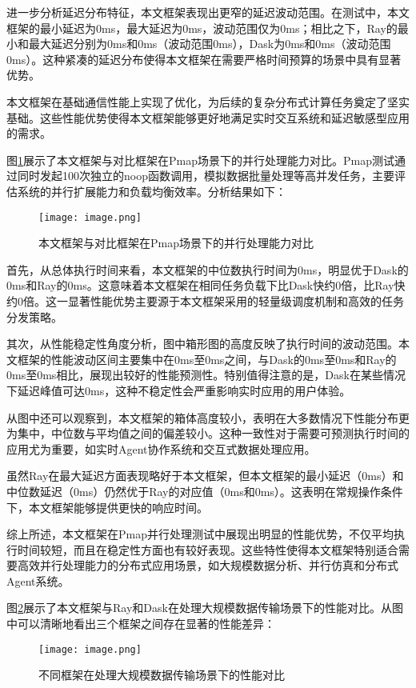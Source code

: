 进一步分析延迟分布特征，本文框架表现出更窄的延迟波动范围。在测试中，本文框架的最小延迟为0ms，最大延迟为0ms，波动范围仅为0ms；相比之下，Ray的最小和最大延迟分别为0ms和0ms（波动范围0ms），Dask为0ms和0ms（波动范围0ms）。这种紧凑的延迟分布使得本文框架在需要严格时间预算的场景中具有显著优势。

本文框架在基础通信性能上实现了优化，为后续的复杂分布式计算任务奠定了坚实基础。这些性能优势使得本文框架能够更好地满足实时交互系统和延迟敏感型应用的需求。

图\ref{fig:exp_pmap}展示了本文框架与对比框架在Pmap场景下的并行处理能力对比。Pmap测试通过同时发起100次独立的noop函数调用，模拟数据批量处理等高并发任务，主要评估系统的并行扩展能力和负载均衡效率。分析结果如下：

\begin{figure}[ht]
    \centering
    \texttt{[image: image.png]}
    \caption{本文框架与对比框架在Pmap场景下的并行处理能力对比}
    \label{fig:exp_pmap}
\end{figure}

首先，从总体执行时间来看，本文框架的中位数执行时间为0ms，明显优于Dask的0ms和Ray的0ms。这意味着本文框架在相同任务负载下比Dask快约0倍，比Ray快约0倍。这一显著性能优势主要源于本文框架采用的轻量级调度机制和高效的任务分发策略。

其次，从性能稳定性角度分析，图中箱形图的高度反映了执行时间的波动范围。本文框架的性能波动区间主要集中在0ms至0ms之间，与Dask的0ms至0ms和Ray的0ms至0ms相比，展现出较好的性能预测性。特别值得注意的是，Dask在某些情况下延迟峰值可达0ms，这种不稳定性会严重影响实时应用的用户体验。

从图中还可以观察到，本文框架的箱体高度较小，表明在大多数情况下性能分布更为集中，中位数与平均值之间的偏差较小。这种一致性对于需要可预测执行时间的应用尤为重要，如实时Agent协作系统和交互式数据处理应用。

虽然Ray在最大延迟方面表现略好于本文框架，但本文框架的最小延迟（0ms）和中位数延迟（0ms）仍然优于Ray的对应值（0ms和0ms）。这表明在常规操作条件下，本文框架能够提供更快的响应时间。

综上所述，本文框架在Pmap并行处理测试中展现出明显的性能优势，不仅平均执行时间较短，而且在稳定性方面也有较好表现。这些特性使得本文框架特别适合需要高效并行处理能力的分布式应用场景，如大规模数据分析、并行仿真和分布式Agent系统。

图\ref{fig:exp_largedata}展示了本文框架与Ray和Dask在处理大规模数据传输场景下的性能对比。从图中可以清晰地看出三个框架之间存在显著的性能差异：

\begin{figure}[htbp]
    \centering
    \texttt{[image: image.png]}
    \caption{不同框架在处理大规模数据传输场景下的性能对比}
    \label{fig:exp_largedata}
\end{figure}

